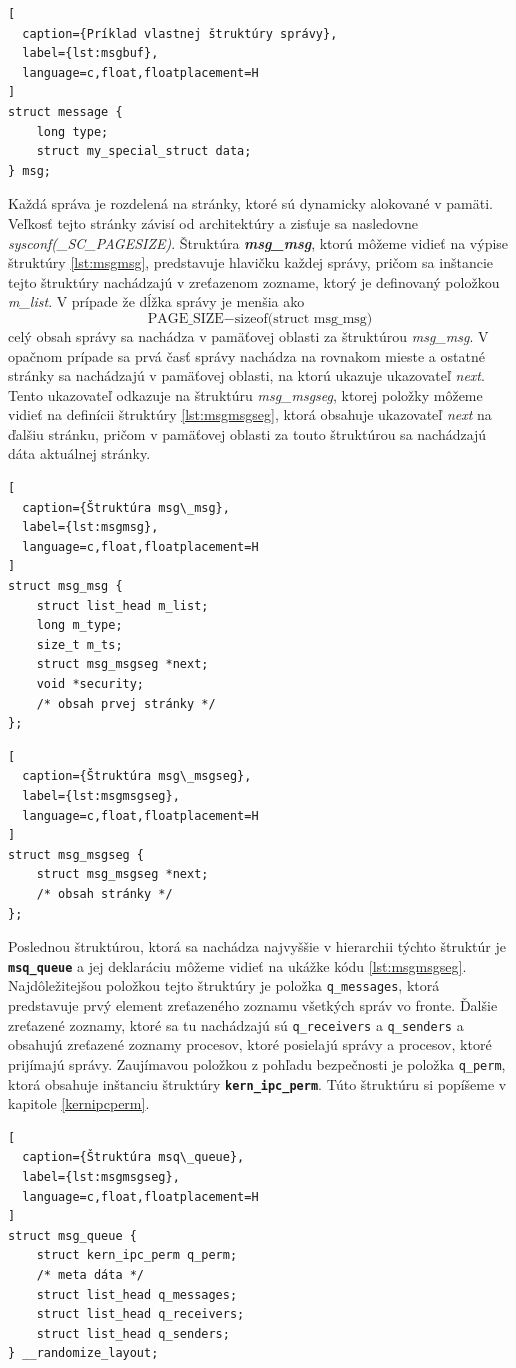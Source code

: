 \begin{lstlisting}[
  caption={Príklad vlastnej štruktúry správy},
  label={lst:msgbuf},
  language=c,float,floatplacement=H
]
struct message {
    long type;
    struct my_special_struct data;    
} msg;
\end{lstlisting}

Každá správa je rozdelená na stránky, ktoré sú dynamicky alokované v pamäti. Veľkosť tejto stránky závisí od architektúry a zisťuje sa nasledovne \textit{sysconf(\_SC\_PAGESIZE)}. Štruktúra \textbf{\textit{msg\_msg}}, ktorú môžeme vidieť na výpise štruktúry \ref{lst:msgmsg}, predstavuje hlavičku každej správy, pričom sa inštancie tejto štruktúry nachádzajú v zreťazenom zozname, ktorý je definovaný položkou \textit{m\_list}. V prípade že dĺžka správy je menšia ako $$ \text{PAGE\_SIZE} - \text{sizeof(struct msg\_msg)} $$ celý obsah správy sa nachádza v pamäťovej oblasti za štruktúrou \textit{msg\_msg}. V opačnom prípade sa prvá časť správy nachádza na rovnakom mieste a ostatné stránky sa nachádzajú v pamäťovej oblasti, na ktorú ukazuje ukazovateľ \textit{next}. Tento ukazovateľ odkazuje na štruktúru \textit{msg\_msgseg}, ktorej položky môžeme vidieť na definícii štruktúry \ref{lst:msgmsgseg}, ktorá obsahuje ukazovateľ \textit{next} na ďalšiu stránku, pričom v pamäťovej oblasti za touto štruktúrou sa nachádzajú dáta aktuálnej stránky.
\begin{lstlisting}[
  caption={Štruktúra msg\_msg},
  label={lst:msgmsg},
  language=c,float,floatplacement=H
]
struct msg_msg {
	struct list_head m_list;
	long m_type;
	size_t m_ts;
	struct msg_msgseg *next;
	void *security;
	/* obsah prvej stránky */
};
\end{lstlisting}

\begin{lstlisting}[
  caption={Štruktúra msg\_msgseg},
  label={lst:msgmsgseg},
  language=c,float,floatplacement=H
]
struct msg_msgseg {
	struct msg_msgseg *next;
	/* obsah stránky */
};
\end{lstlisting}

Poslednou štruktúrou, ktorá sa nachádza najvyššie v hierarchii týchto štruktúr je \texttt{\textbf{msq\_queue}} a jej deklaráciu môžeme vidieť na ukážke kódu \ref{lst:msgmsgseg}. Najdôležitejšou položkou tejto štruktúry je položka \texttt{q\_messages}, ktorá predstavuje prvý element zreťazeného zoznamu všetkých správ vo fronte. Ďalšie zreťazené zoznamy, ktoré sa tu nachádzajú sú \texttt{q\_receivers} a \texttt{q\_senders} a obsahujú zreťazené zoznamy procesov, ktoré posielajú správy a procesov, ktoré prijímajú správy. Zaujímavou položkou z pohľadu bezpečnosti je položka \texttt{q\_perm}, ktorá obsahuje inštanciu štruktúry \texttt{\textbf{kern\_ipc\_perm}}. Túto štruktúru si popíšeme v kapitole \ref{kernipcperm}.\cite{linux}
\begin{lstlisting}[
  caption={Štruktúra msq\_queue},
  label={lst:msgmsgseg},
  language=c,float,floatplacement=H
]
struct msg_queue {
	struct kern_ipc_perm q_perm;
	/* meta dáta */		
	struct list_head q_messages;
	struct list_head q_receivers;
	struct list_head q_senders;
} __randomize_layout;
\end{lstlisting}

